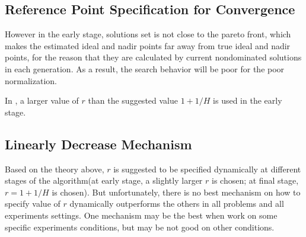 \documentclass[conference]{IEEEtran}
\begin{document}
%
% 
\subsection{Reference Point Specification for Convergence}
However in the early stage, solutions set is not close to the pareto front, which makes the 
estimated ideal and nadir points far away from true ideal and nadir points, for the reason that
they are calculated by current nondominated solutions in each generation.
As a result, the search behavior will be poor for the poor normalization\cite{hisao, hisao26}.

In \cite{hisao}, a larger value of $r$ than the suggested value $1+1/H$ is used
in the early stage.

% 
\subsection{Linearly Decrease Mechanism}
Based on the theory above, $r$ is suggested to be specified dynamically at different stages of
the algorithm(at early stage, a slightly larger $r$ is chosen; at final stage, $r=1+1/H$ is chosen).
But unfortunately, there is no best mechanism on how to specify value of $r$ dynamically
outperforms the others in all problems and all experiments settings. One mechanism may be the best
when work on some specific experiments conditions, but may be not good on other conditions. 
\end{document}
